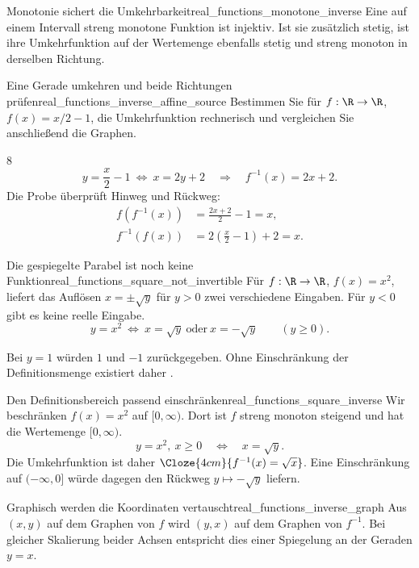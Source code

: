 \begin{TheoremBox}{Monotonie sichert die Umkehrbarkeit}{real_functions_monotone_inverse}
  Eine auf einem Intervall streng monotone Funktion ist injektiv.
  Ist sie zusätzlich stetig, ist ihre Umkehrfunktion auf der \textcolor{green!55!black}{Wertemenge}
  ebenfalls stetig und streng monoton in derselben Richtung.
\end{TheoremBox}
\begin{ExampleBox}{Eine Gerade umkehren und beide Richtungen prüfen}{real_functions_inverse_affine_source}
  Bestimmen Sie für $f:\R\to\R$, $f(x)=x/2-1$, die Umkehrfunktion
  rechnerisch und vergleichen Sie anschließend die Graphen.
  \begin{ClozeArea}[34]{8}
    \[
      y=\frac x2-1\ \Longleftrightarrow\ x=2y+2
      \quad\Longrightarrow\quad f^{-1}(x)=2x+2.
    \]
    Die Probe überprüft Hinweg und Rückweg:
    \[
      \begin{aligned}
        f(f^{-1}(x))&=\frac{2x+2}{2}-1=x,\\[0.5em]
        f^{-1}(f(x))&=2\left(\frac x2-1\right)+2=x.
      \end{aligned}
    \]
  \end{ClozeArea}
  \begin{center}
  \end{center}
\end{ExampleBox}
\begin{ExampleBox}{Die gespiegelte Parabel ist noch keine Funktion}{real_functions_square_not_invertible}
  Für $f:\R\to\R$, $f(x)=x^2$, liefert das Auflösen
  $x=\pm\sqrt y$ für $y>0$ zwei verschiedene Eingaben.
  Für $y<0$ gibt es keine reelle Eingabe.
  \[
    y=x^2\ \Longleftrightarrow\ x=\sqrt y\ \text{oder}\ x=-\sqrt y
    \qquad(y\ge0).
  \]
  \begin{center}
  \end{center}
  Bei $y=1$ würden $1$ und $-1$ zurückgegeben. Ohne Einschränkung
  der Definitionsmenge existiert daher .
\end{ExampleBox}
\begin{ExampleBox}{Den Definitionsbereich passend einschränken}{real_functions_square_inverse}
  Wir beschränken $f(x)=x^2$ auf $[0,\infty)$. Dort ist $f$ streng
  monoton steigend und hat die \textcolor{green!55!black}{Wertemenge} $[0,\infty)$.
  \[
    y=x^2,\ x\ge0
    \quad\Longleftrightarrow\quad
    x=\sqrt y.
  \]
  Die Umkehrfunktion ist daher $\Cloze{4cm}{f^{-1}(x)=\sqrt x}$.
  Eine Einschränkung auf $(-\infty,0]$ würde dagegen den Rückweg
  $y\mapsto-\sqrt y$ liefern.
  \begin{center}
  \end{center}
\end{ExampleBox}
\begin{KeyPointBox}{Graphisch werden die Koordinaten vertauscht}{real_functions_inverse_graph}
  Aus $(x,y)$ auf dem Graphen von $f$ wird $(y,x)$ auf dem Graphen von
  $f^{-1}$. Bei gleicher Skalierung beider Achsen entspricht dies einer
  Spiegelung an der Geraden $y=x$.
\end{KeyPointBox}
